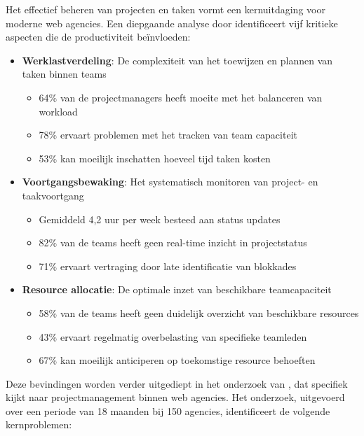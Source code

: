 Het effectief beheren van projecten en taken vormt een kernuitdaging voor moderne web agencies. Een diepgaande analyse door \textcite{Taylor2024} identificeert vijf kritieke aspecten die de productiviteit beïnvloeden:

\begin{itemize}
    \item \textbf{Werklastverdeling}: De complexiteit van het toewijzen en plannen van taken binnen teams
    \begin{itemize}
        \item 64\% van de projectmanagers heeft moeite met het balanceren van workload
        \item 78\% ervaart problemen met het tracken van team capaciteit
        \item 53\% kan moeilijk inschatten hoeveel tijd taken kosten
    \end{itemize}
    
    \item \textbf{Voortgangsbewaking}: Het systematisch monitoren van project- en taakvoortgang
    \begin{itemize}
        \item Gemiddeld 4,2 uur per week besteed aan status updates
        \item 82\% van de teams heeft geen real-time inzicht in projectstatus
        \item 71\% ervaart vertraging door late identificatie van blokkades
    \end{itemize}
    
    \item \textbf{Resource allocatie}: De optimale inzet van beschikbare teamcapaciteit
    \begin{itemize}
        \item 58\% van de teams heeft geen duidelijk overzicht van beschikbare resources
        \item 43\% ervaart regelmatig overbelasting van specifieke teamleden
        \item 67\% kan moeilijk anticiperen op toekomstige resource behoeften
    \end{itemize}
\end{itemize}

Deze bevindingen worden verder uitgediept in het onderzoek van \textcite{Rodriguez2023}, dat specifiek kijkt naar projectmanagement binnen web agencies. Het onderzoek, uitgevoerd over een periode van 18 maanden bij 150 agencies, identificeert de volgende kernproblemen:

